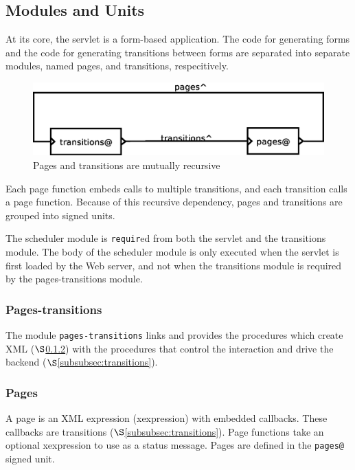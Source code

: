 \documentclass[a4paper]{article}
\begin{document}
\subsection{Modules and Units}\label{subsec:components}

At its core, the servlet is a form-based application. The code for generating 
forms and the code for generating transitions between forms are separated into 
separate modules, named pages, and transitions, respecitively.

\begin{figure}[ht]
\centering
\includegraphics[scale=.30]{units.eps}
\caption{Pages and transitions are mutually recursive}
\label{fig:layout}
\end{figure}

Each page function embeds calls to multiple transitions, and each transition
calls a page function. Because of this recursive dependency, pages and 
transitions are grouped into signed units.

The scheduler module is \verb|requir|ed from both the servlet and the
transitions module. The body of the scheduler module is only executed when the
servlet is first loaded by the Web server, and not when the transitions module
is required by the pages-transitions module.

\subsubsection{Pages-transitions}\label{subsubsec:pages-transitions}

The module \verb|pages-transitions| links and provides the procedures which
create XML ($\S$\ref{subsubsec:pages}) with the procedures that control the
interaction and drive the backend ($\S$\ref{subsubsec:transitions}).

\subsubsection{Pages}\label{subsubsec:pages}

A page is an XML expression (xexpression) with embedded callbacks. These callbacks
are transitions ($\S$\ref{subsubsec:transitions}). Page functions take an
optional xexpression to use as a status message. Pages are defined in the
\verb|pages@| signed unit.
\end{document}

